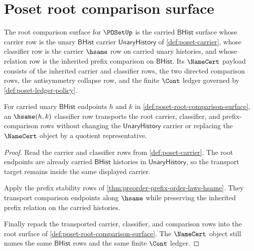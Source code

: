 \section{Poset root comparison surface}
\label{sec:poset-root-comparison-surface}

\begin{definition}\label{def:poset-root-comparison-surface}
The root comparison surface for $\POSetUp$ is the carried $\mathsf{BHist}$
surface whose carrier row is the unary $\mathsf{BHist}$ carrier
$\mathsf{UnaryHistory}$ of \autoref{def:poset-carrier}, whose classifier row
is the carrier $\hsame$ row on carried unary histories, and whose relation row
is the inherited prefix comparison on $\mathsf{BHist}$. Its $\NameCert$
payload consists of the inherited carrier and classifier rows, the two
directed comparison rows, the antisymmetry collapse row, and the finite
$\Cont$ ledger governed by \autoref{def:poset-ledger-policy}.
\end{definition}

\begin{theorem}\label{thm:poset-root-hsame-transport-surface}
For carried unary $\mathsf{BHist}$ endpoints $h$ and $k$ in
\autoref{def:poset-root-comparison-surface}, an $\hsame(h,k)$ classifier row
transports the root carrier, classifier, and prefix-comparison rows without
changing the $\mathsf{UnaryHistory}$ carrier or replacing the $\NameCert$
object by a quotient representative.
\end{theorem}
\begin{proof}
Read the carrier and classifier rows from \autoref{def:poset-carrier}. The
root endpoints are already carried $\mathsf{BHist}$ histories in
$\mathsf{UnaryHistory}$, so the transport target remains inside the same
displayed carrier.

Apply the prefix stability rows of
\autoref{thm:preorder-prefix-order-laws-hsame}. They transport comparison
endpoints along $\hsame$ while preserving the inherited prefix relation on
the carried histories.

Finally repack the transported carrier, classifier, and comparison rows into
the root surface of \autoref{def:poset-root-comparison-surface}. The
$\NameCert$ object still names the same $\mathsf{BHist}$ rows and the same
finite $\Cont$ ledger.
\end{proof}

